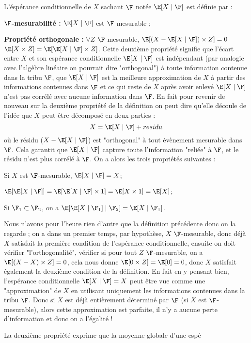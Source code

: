 L'éspérance conditionnelle de $X$ sachant $\F$ notée $\E[X \mid \F]$ est définie par :
\ben
    \item \textbf{$\F$-mesurabilité :} $\E[X\mid \F]$ est $\F$-mesurable ;
    \item \textbf{Propriété orthogonale :} $\forall Z$ $\F$-mesurable, $\E[(X - \E[X \mid \F])\times Z ] = 0$ \ssi $\E[X\times Z] = \E[\E[X\mid \F] \times Z]$.
    \bn
    Cette deuxième propriété signifie que l'écart entre $X$ et son espérance conditionnelle $\E[X\mid \F]$ est indépendant (par analogie avec l'algèbre linéaire on pourrait dire "orthogonal") à toute information contenue dans la tribu $\F$, \ie que $\E[X\mid \F]$ est la meilleure approximation de $X$ à partir des informations contenues dans $\F$ et ce qui reste de $X$ après avoir enlevé $\E[X\mid \F]$ n'est pas corrélé avec aucune information dans $\F$.
    \en
\een
\ed
{} En fait pour revenir de nouveau sur la deuxième propriété de la définition on peut dire qu'elle découle de l'idée que $X$ peut être décomposé en deux parties : $$X = \E[X\mid \F] + residu$$ où le résidu ($X- \E[X\mid \F]$) est "orthogonal" à tout évènement mesurable dans $\F$. Cela garantit que $\E[X\mid \F]$ capture toute l'information "reliée" à $\F$, et le résidu n'est plus corrélé à $\F$.
\bp
On a alors les trois propriétés suivantes :
\ben
    \item Si $X$ est $\F$-mesurable, $\E[X\mid \F] = X$;
    \item $\E[\E[X\mid \F]] = \E[\E[X\mid \F]\times 1] = \E[X \times 1] = \E[X]$;
    \item Si $\F_1 \subset \F_2$, on a $\E[\E[X\mid \F_1]\mid \F_2] = \E[X\mid \F_1]$.
\een
\ep
\bpf[esquisse]
\ben
    \item Nous n'avons pour l'heure rien d'autre que la définition précédente donc on la regarde  ; on a dans un premier temps, par hypothèse, $X$ $\F$-mesurable, donc déjà $X$ satisfait la première condition de l'espérance conditionnelle, ensuite on doit vérifier "l'orthogonalité", \ie vérifier si pour tout $Z$ $\F$-mesurable, on a $\E[(X-X)\times Z] = 0$, cela nous donne $\E[0\times Z] =\E[0] = 0$, donc $X$ satisfait également la deuxième condition de la définition.
    \bn
    En fait en y pensant bien, l'espérance conditionnelle $\E[X\mid \F] = X$ peut être vue comme une "approximation" de $X$ en utilisant uniquement les informations contenues dans la tribu $\F$. Donc si $X$ est déjà entièrement déterminé par $\F$ (\ie si $X$ est $\F$-mesurable), alors cette approximation est parfaite, il n'y a aucune perte d'information et donc on a l'égalité ! 
    \en
    \item La deuxième propriété exprime que la moyenne globale d'une espé
\een
\epf
    
    
    
    
    
    
    
    
    
    
    

